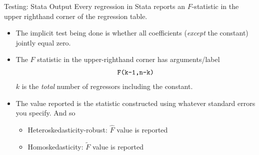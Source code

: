\documentclass[aspectratio=169, handout]{beamer}
\begin{document}
\begin{frame}[shrink]{Testing: Stata Output}
Every regression in Stata reports an $F$-statistic in the upper
righthand corner of the regression table.
\begin{itemize}
  \item The \alert{implicit test} being done is whether all coefficients
    (\emph{except} the constant) jointly equal zero.
  \item The $F$ statistic in the upper-righthand corner has
    \alert{arguments}/\alert{label}
    \begin{align*}
      \text{\texttt{F(k-1,n-k)}}
    \end{align*}
    $k$ is the \emph{total} number of regressors including the constant.
  \item
    The \alert{value} reported is the statistic constructed using
    whatever standard errors you specify.
    And so
    \begin{itemize}
      \item Heteroskedasticity-robust: $\hat{F}$ value is reported
      \item Homoskedasticity: $\widetilde{F}$ value is reported
    \end{itemize}
\end{itemize}
\end{frame}
\end{document}

